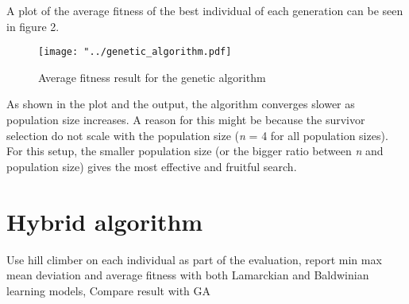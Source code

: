 \documentclass{article}
\begin{document}
\noindent
A plot of the average fitness of the best individual of each generation can be seen in figure 2.
\begin{figure}[H]
\begin{center}
\texttt{[image: "../genetic\_algorithm.pdf]}
\caption{Average fitness result for the genetic algorithm}
\end{center}
\end{figure}
As shown in the plot and the output, the algorithm converges slower as population size increases. A reason for this might be because the survivor selection do not scale with the population size (\textit{n} = 4 for all population sizes). For this setup, the smaller population size (or the bigger ratio between \textit{n} and population size) gives the most effective and fruitful search.



\section{Hybrid algorithm}
Use hill climber on each individual as part of the evaluation, report min max mean deviation and average fitness with both Lamarckian and Baldwinian learning models, Compare result with GA
\end{document}
